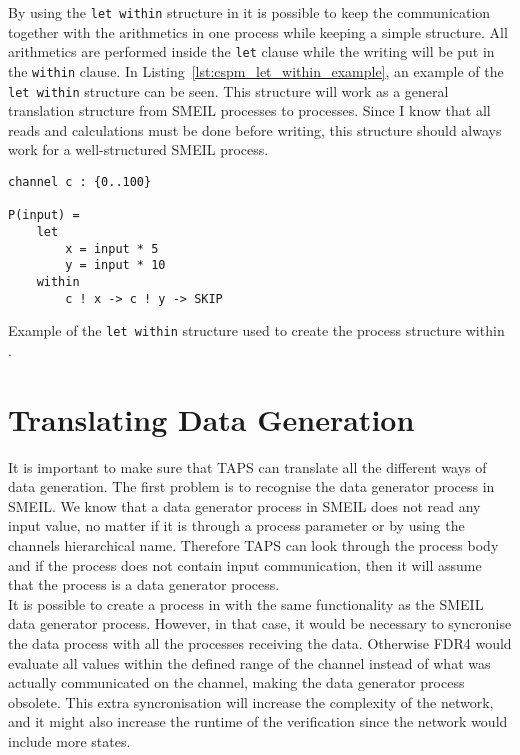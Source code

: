By using the \texttt{let within} structure in \cspm{} it is possible to keep the communication together with the arithmetics in one \cspm{} process while keeping a simple structure. All arithmetics are performed inside the \texttt{let} clause while the writing will be put in the \texttt{within} clause.
In Listing~\ref{lst:cspm_let_within_example}, an example of the \texttt{let within} structure can be seen. This structure will work as a general translation structure from SMEIL processes to \cspm{} processes. Since I know that all reads and calculations must be done before writing, this structure should always work for a well-structured SMEIL process.
\begin{listing}
\begin{verbatim}
channel c : {0..100}

P(input) =
    let
        x = input * 5
        y = input * 10
    within
        c ! x -> c ! y -> SKIP
\end{verbatim}
\caption{Example of the \texttt{let within} structure used to create the process structure within \cspm{}.}
\label{lst:cspm_let_within_example}
\end{listing}
\section{Translating Data Generation}
It is important to make sure that TAPS can translate all the different ways of data generation. The first problem is to recognise the data generator process in SMEIL. We know that a data generator process in SMEIL does not read any input value, no matter if it is through a process parameter or by using the channels hierarchical name. Therefore TAPS can look through the process body and if the process does not contain input communication, then it will assume that the process is a data generator process. \\

It is possible to create a process in \cspm with the same functionality as the SMEIL data generator process. However, in that case, it would be necessary to syncronise the data process with all the processes receiving the data. Otherwise FDR4 would evaluate all values within the defined range of the channel instead of what was actually communicated on the channel, making the data generator process obsolete. This extra syncronisation will increase the complexity of the \cspm{} network, and it might also increase the runtime of the verification since the \cspm{} network would include more states.

